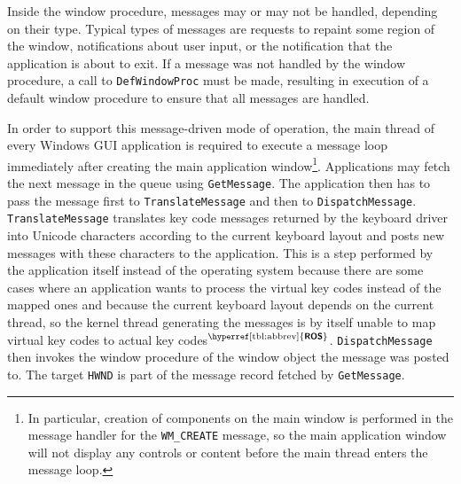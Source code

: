 \documentclass[10pt,twocolumn,a4paper]{article}
\newcommand{\bs}[1]{\textbf{\sffamily #1}}
\newcommand{\winver}[1]{$^{\text{\hyperref[tbl:abbrev]{\bs{#1}}}}$}
\begin{document}
			Inside the window procedure, messages may or may not be handled, depending
			on their type. Typical types of messages are requests to repaint some
			region of the window, notifications about user input, or the notification
			that the application is about to exit. If a message was not handled
			by the window procedure, a call to \texttt{DefWindowProc} must be
			made, resulting in execution of a default window procedure to
			ensure that all messages are handled. \cite{aboutwinproc}

			In order to support this message-driven mode of operation, the main
			thread of every Windows GUI application is required to execute a
			message loop immediately after creating the main application
			window\footnote{In particular, creation of components on the main
			window is performed in the message handler for the
			\texttt{WM\_CREATE} message, so the main application window will
			not display any controls or content before the main thread enters
			the message loop.}. Applications may fetch the next message in the
			queue using \texttt{GetMessage}. The application then has to pass
			the message first to \texttt{TranslateMessage} and then to
			\texttt{DispatchMessage}. \texttt{TranslateMessage} translates key
			code messages returned by the keyboard driver into Unicode
			characters according to the current keyboard layout and posts new
			messages with these characters to the application. This is a step performed
			by the application itself instead of the operating system because
			there are some cases where an application wants to process the virtual
			key codes instead of the mapped ones \cite{translatemessage} and because the current keyboard
			layout depends on the current thread, so the kernel thread generating
			the messages is by itself unable to map virtual key codes to actual
			key codes\winver{ROS}. \texttt{DispatchMessage} then invokes the window procedure
			of the window object the message was posted to. The target \texttt{HWND}
			is part of the message record fetched by \texttt{GetMessage}. \cite{messages}
\end{document}
